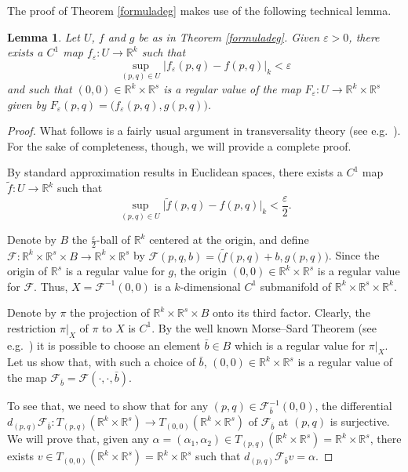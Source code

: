\documentclass[a4paper]{amsart}
\numberwithin{equation}{section}
\newtheorem{lemma}[theorem]{Lemma}
\newcommand{\R}{\mathbb{R}}
\newcommand{\F}{\mathcal{F}}
\newcommand{\e}{\varepsilon}
\begin{document}
The proof of Theorem \ref{formuladeg} makes use of the following technical lemma. 

\begin{lemma}\label{approxf}
Let $U$, $f$ and $g$ be as in Theorem \ref{formuladeg}. Given $\e>0$, there exists a $C^1$ 
map $f_\e:U\to\R^k$ such that 
\[
 \sup_{(p,q)\in U}\big|f_\e(p,q)-f(p,q)\big|_k<\e
\]
and such that $(0,0)\in\R^k\times\R^s$ is a regular value of the map $F_\e:U\to\R^k\times\R^s$
given by $F_\e(p,q)=\big(f_\e(p,q),g(p,q)\big)$.
\end{lemma}
\begin{proof}
What follows is a fairly usual argument in transversality theory (see e.g.\ \cite{GP}). For the 
sake of completeness, though, we will provide a complete proof.

By standard approximation results in Euclidean spaces, there exists a $C^1$ map 
$\tilde f:U\to\R^k$ such that
\[
 \sup_{(p,q)\in U}\big|\tilde f(p,q)-f(p,q)\big|_k<\frac{\e}{2}.
\]

Denote by $B$ the $\frac{\e}{2}$-ball of $\R^k$ centered at the origin, and define 
$\F:\R^k\times\R^s\times B\to\R^k\times\R^s$ by $\F(p,q,b)=\big(\tilde f(p,q)+b,g(p,q)\big)$.
Since the origin of $\R^s$ is a regular value for $g$, the origin $(0,0)\in\R^k\times\R^s$ is 
a regular value for $\F$. Thus, $X=\F^{-1}(0,0)$ is a $k$-dimensional $C^1$ submanifold of
$\R^k\times\R^s\times\R^k$. 

Denote by $\pi$ the projection of $\R^k\times\R^s\times B$ onto its third factor. Clearly,
the restriction $\pi|_X$ of $\pi$ to $X$ is $C^1$. By the well known Morse--Sard Theorem 
(see e.g.\ \cite{H}) it is possible to choose an element $\bar b\in B$ which is a regular value 
for $\pi|_X$. Let us show that, with such a choice of $\bar b$, $(0,0)\in\R^k\times\R^s$ is a 
regular value of the map $\F_{\bar b}=\F(\cdot,\cdot,\bar b)$.

To see that, we need to show that for any $(p,q)\in\F_{\bar b}^{-1}(0,0)$, the differential
$d_{(p,q)}\F_{\bar b}:T_{(p,q)}(\R^k\times\R^s)\to T_{(0,0)}(\R^k\times\R^s)$ of $\F_{\bar b}$ 
at $(p,q)$ is surjective. We will prove that, given any $\alpha=(\alpha_1,\alpha_2)\in T_{(p,q)}(\R^k\times\R^s)=\R^k\times\R^s$, there exists $v\in T_{(0,0)}(\R^k\times\R^s)=\R^k\times\R^s$ such that $d_{(p,q)}\F_{\bar b} v=\alpha$.


\end{proof}
\end{document}
